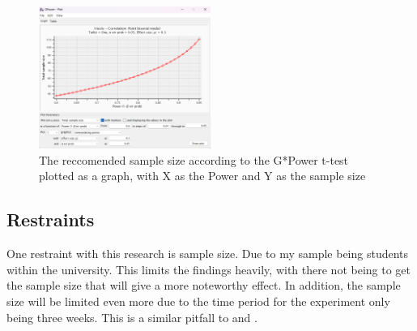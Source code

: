 \documentclass[conference]{IEEEtran}
\begin{document}
\begin{figure}[H]
\includegraphics[width = 0.5\textwidth]{fig2(2)}
\caption{The reccomended sample size according to the G*Power t-test plotted as a graph, with X as the Power and Y as the sample size}
\end{figure}

\subsection {Restraints}
One restraint with this research is sample size. Due to my sample being students within the university. This limits the findings heavily, with there not being to get the sample size that will give a more noteworthy effect. In addition, the sample size will be limited even more due to the time period for the experiment only being three weeks. This is a similar pitfall to \cite{Naaj2021} and \cite{Ruqeyya2022}.\\






\end{document}
